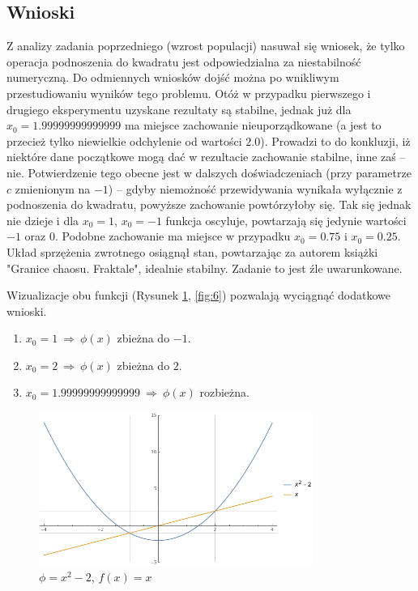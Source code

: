 \documentclass{classrep}
\begin{document}
	\subsection{Wnioski}
		Z analizy zadania poprzedniego (wzrost populacji) nasuwał się wniosek, że tylko operacja podnoszenia do kwadratu jest odpowiedzialna za niestabilność numeryczną. Do odmiennych wniosków dojść można po wnikliwym przestudiowaniu wyników tego problemu. Otóż w przypadku pierwszego i drugiego eksperymentu uzyskane rezultaty są stabilne, jednak już dla $x_0=1.99999999999999$ ma miejsce zachowanie nieuporządkowane (a jest to przecież tylko niewielkie odchylenie od wartości $2.0$). Prowadzi to do konkluzji, iż niektóre dane początkowe mogą dać w rezultacie zachowanie stabilne, inne zaś -- nie.
		Potwierdzenie tego obecne jest w dalszych doświadczeniach (przy parametrze $c$ zmienionym na $-1$) -- gdyby niemożność przewidywania wynikała wyłącznie z podnoszenia do kwadratu, powyższe zachowanie powtórzyłoby się. Tak się jednak nie dzieje i dla $x_0=1$, $x_0=-1$ funkcja oscyluje, powtarzają się jedynie wartości $-1$ oraz $0$.  Podobne zachowanie ma miejsce w przypadku $x_0=0.75$ i $x_0=0.25$. Układ sprzężenia zwrotnego osiągnął stan, powtarzając za autorem książki "Granice chaosu. Fraktale", idealnie stabilny. Zadanie to jest źle uwarunkowane.
		
				
		Wizualizacje obu funkcji (Rysunek \ref{fig:5}, \ref{fig:6}) pozwalają wyciągnąć dodatkowe wnioski.
		\begin{enumerate}[1.]
			\item $x_0 = 1 ~\Rightarrow~ \phi(x)$ zbieżna do $-1$.
			\item $x_0 = 2 ~\Rightarrow~ \phi(x)$ zbieżna do $2$.
			\item $x_0 = 1.99999999999999 ~\Rightarrow~ \phi(x)$ rozbieżna.
		\end{enumerate}
		
		\begin{figure}[!htbp]
			\centering
			\includegraphics[width=0.8\textwidth]{zad6/Myplot1.png}
  			\caption{$\phi=x^2-2$, $f(x)=x$}
  			\label{fig:5}
		\end{figure}	
		
\end{document}
